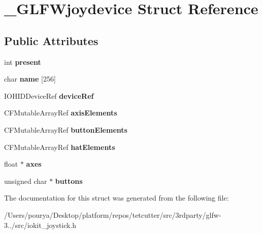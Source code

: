 \hypertarget{struct__GLFWjoydevice}{}\section{\+\_\+\+G\+L\+F\+Wjoydevice Struct Reference}
\label{struct__GLFWjoydevice}
\subsection*{Public Attributes}
\begin{DoxyCompactItemize}
\item 
\hypertarget{struct__GLFWjoydevice_a5ffe7026384122f665d86192fb930c4b}{}int {\bfseries present}\label{struct__GLFWjoydevice_a5ffe7026384122f665d86192fb930c4b}

\item 
\hypertarget{struct__GLFWjoydevice_a742201a3bf61a988efc3f7b24d89ffbc}{}char {\bfseries name} \mbox{[}256\mbox{]}\label{struct__GLFWjoydevice_a742201a3bf61a988efc3f7b24d89ffbc}

\item 
\hypertarget{struct__GLFWjoydevice_aeca770877346502945771709a202553b}{}I\+O\+H\+I\+D\+Device\+Ref {\bfseries device\+Ref}\label{struct__GLFWjoydevice_aeca770877346502945771709a202553b}

\item 
\hypertarget{struct__GLFWjoydevice_a10ac0c8f3dc234416882829b959d5bc2}{}C\+F\+Mutable\+Array\+Ref {\bfseries axis\+Elements}\label{struct__GLFWjoydevice_a10ac0c8f3dc234416882829b959d5bc2}

\item 
\hypertarget{struct__GLFWjoydevice_ab0fbc1d4c2bb315fda4e11a61e0dacde}{}C\+F\+Mutable\+Array\+Ref {\bfseries button\+Elements}\label{struct__GLFWjoydevice_ab0fbc1d4c2bb315fda4e11a61e0dacde}

\item 
\hypertarget{struct__GLFWjoydevice_a63c0360ff20f2ad21cc158cee2ee129b}{}C\+F\+Mutable\+Array\+Ref {\bfseries hat\+Elements}\label{struct__GLFWjoydevice_a63c0360ff20f2ad21cc158cee2ee129b}

\item 
\hypertarget{struct__GLFWjoydevice_aa6a16dc23af7d8c7426a7bcb8374dc7a}{}float $\ast$ {\bfseries axes}\label{struct__GLFWjoydevice_aa6a16dc23af7d8c7426a7bcb8374dc7a}

\item 
\hypertarget{struct__GLFWjoydevice_a384a343f22ac269d7ca5fde9cf933dec}{}unsigned char $\ast$ {\bfseries buttons}\label{struct__GLFWjoydevice_a384a343f22ac269d7ca5fde9cf933dec}

\end{DoxyCompactItemize}


The documentation for this struct was generated from the following file\+:\begin{DoxyCompactItemize}
\item 
/\+Users/pourya/\+Desktop/platform/repos/tetcutter/src/3rdparty/glfw-\/3../src/iokit\+\_\+joystick.\+h\end{DoxyCompactItemize}
